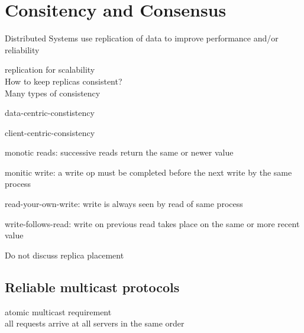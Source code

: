\documentclass[ngerman,a4paper]{report}
\begin{document}

\chapter{Consitency and Consensus}
\begin{compactitem}
	\item Distributed Systems use replication of data to improve performance and/or reliability
	\item replication for scalability\\
	How to keep replicas consistent?\\
	Many types of consistency\\
	\begin{compactitem}
		\item data-centric-constistency
		\item client-centric-consistency
	\item monotic reads: successive reads return the same or newer value
	\item monitic write: a write op must be completed before the next write by the same process
	\item read-your-own-write: write is always seen by read of same process
	\item write-follows-read: write on previous read takes place on the same or more recent value
	\end{compactitem}
	\item Do not discuss replica placement
\end{compactitem}
\section{Reliable multicast protocols}
\begin{compactitem}
	\item atomic multicast requirement\\
	all requests arrive at all servers in the same order
\end{compactitem}
\end{document}
